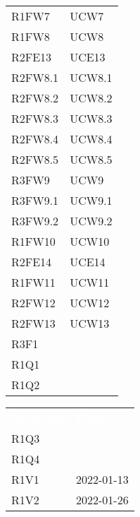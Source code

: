 \begin{table}[!htbp]
\begin{tabular}{ m{}<{\centering}  m{}<{\centering} }
	R1FW7 & UCW7\\	
	 
	R1FW8 & UCW8\\		
	
	R2FE13 & UCE13\\	
	 
	R2FW8.1 & UCW8.1\\	
	 
	R2FW8.2 & UCW8.2\\	
	 
	R2FW8.3 & UCW8.3\\	
	 
	R2FW8.4 & UCW8.4\\	 
	 
	R2FW8.5 & UCW8.5\\	 
	 
	R3FW9 & UCW9\\	
	 
	R3FW9.1 & UCW9.1\\	 
	 
	R3FW9.2 & UCW9.2\\	  
	 
	R1FW10 & UCW10 \\	 
	 
	R2FE14 & UCE14\\	 
	 	 
	R1FW11 & UCW11\\	 	 	 	

	R2FW12 & UCW12\\

	R2FW13 & UCW13\\

	R3F1 & \Di \\
	
	R1Q1 & \Di \\
	
	R1Q2 & \Ca \\

\end{tabular}
\begin{tabular}{ m{}<{\centering}  m{}<{\centering} }
	\rowcolor{darkblue}
	\textcolor{white}{\textbf{Requisito}} &\textcolor{white}{\textbf{Fonti}}\\ 

	R1Q3 & \Ca \\

	R1Q4 &  \Ca \\

	R1V1 & \Vi{} 2022-01-13 \\	

	R1V2 & \Ve{} 2022-01-26 \\	
	 

\end{tabular}
\end{table}
